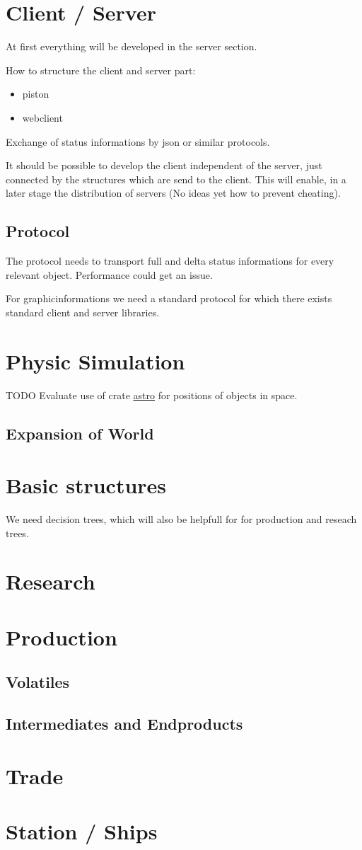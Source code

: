 \section{Client / Server}
At first everything will be developed in the server section. 

How to structure the client and server part:
\begin{itemize}
 \item piston 
 \item webclient
\end{itemize}
Exchange of status informations by json or similar protocols.

It should be possible to develop the client independent of the server, just connected
by the structures which are send to the client. This will enable, in a later stage
the distribution of servers (No ideas yet how to prevent cheating).

\subsection{Protocol}

The protocol needs to transport full and delta status informations for every relevant object. 
Performance could get an issue.

For graphicinformations we need a standard protocol for which there exists standard client
and server libraries.

\section{Physic Simulation}
TODO Evaluate use of crate \href{https://github.com/saurvs/astro-rust}{astro} for positions of objects in space.

\subsection{Expansion of World}

\section{Basic structures}
We need decision trees, which will also be helpfull for for production and reseach trees.

\section{Research}

\section{Production}

\subsection{Volatiles}

\subsection{Intermediates and Endproducts}

\section{Trade}

\section{Station / Ships}